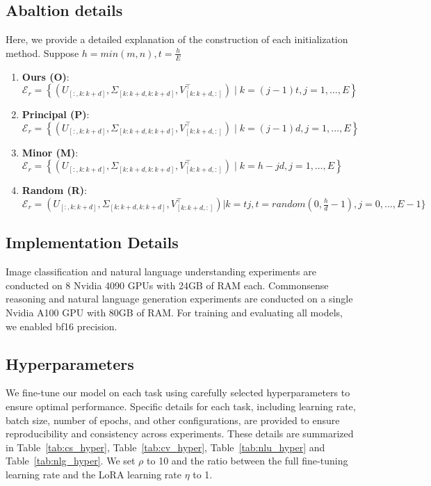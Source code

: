 \subsection{Abaltion details}\label{app:ablation}
Here, we provide a detailed explanation of the construction of each initialization method.
Suppose $h=min(m,n),t=\frac{h}{E}$
\begin{enumerate}
\item \textbf{Ours (O)}: \(\mathcal{E}_r = \left\{(U_{ [:, k:k + d]}, \Sigma_{[k:k+d,k:k+d]}, V_{[k:k+d,:]}^\top) \mid k=(j-1)t,j = 1, \dots, E \right\}\)
\item  \textbf{Principal (P)}: \(\mathcal{E}_r = \left\{(U_{ [:, k:k + d]}, \Sigma_{[k:k+d,k:k+d]}, V_{[k:k+d,:]}^\top) \mid k=(j-1)d,j = 1, \dots, E \right\}\)
\item \textbf{Minor (M)}:\(\mathcal{E}_r = \left\{(U_{ [:, k:k + d]}, \Sigma_{[k:k+d,k:k+d]}, V_{[k:k+d,:]}^\top) \mid k=h-jd,j = 1, \dots, E \right\}\)
\item \textbf{Random (R)}:\(\mathcal{E}_r=(U_{ [:, k:k + d]}, \Sigma_{[k:k+d,k:k+d]}, V_{[k:k+d,:]}^\top)|k=tj,t=random(0,\frac{h}{d}-1),j=0,...,E-1\}\)
\end{enumerate}

\subsection{Implementation Details}\label{app:implementation}

Image classification and natural language understanding experiments are conducted on 8 Nvidia 4090 GPUs with 24GB of RAM each. Commonsense reasoning and natural language generation experiments are conducted on a single Nvidia A100 GPU with 80GB of RAM. For training and evaluating all models, we enabled bf16 precision.



\subsection{Hyperparameters}\label{app:hyper}

We fine-tune our model on each task using carefully selected hyperparameters to ensure optimal performance. Specific details for each task, including learning rate, batch size, number of epochs, and other configurations, are provided to ensure reproducibility and consistency across experiments. These details are summarized in Table~\ref{tab:cs_hyper}, Table~\ref{tab:cv_hyper}, Table~\ref{tab:nlu_hyper} and Table~\ref{tab:nlg_hyper}.
We set \(\rho\) to 10 and the ratio between the full fine-tuning learning rate and the LoRA learning rate \(\eta\) to 1.
% 

